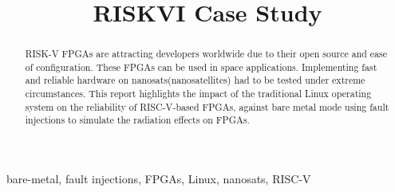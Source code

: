 \documentclass[conference]{IEEEtran}
\begin{document}
\title{RISKVI Case Study\\}
\author{
}
\maketitle

\begin{abstract}
RISK-V FPGAs are attracting developers worldwide due to their open source and 
ease of configuration. These FPGAs can be used in space applications. Implementing fast and reliable 
hardware on nanosats(nanosatellites) had to be tested under extreme circumstances. This report highlights the
impact of the traditional Linux operating system on the reliability of RISC-V-based FPGAs, against bare metal mode 
using fault injections to simulate the radiation effects on FPGAs. 
\end{abstract}
\begin{IEEEkeywords}
bare-metal, fault injections, FPGAs, Linux, nanosats, RISC-V
\end{IEEEkeywords}

\end{document}
